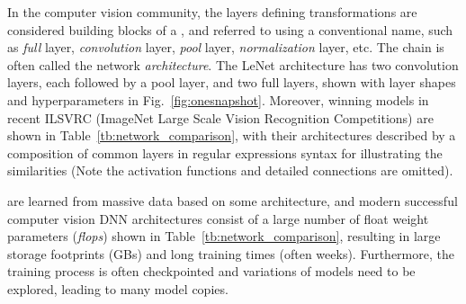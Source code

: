 \documentclass[conference]{IEEEtran}
\begin{document}
In the computer vision community, the layers defining transformations are considered building blocks of a \dnn\model, and referred to using a conventional name, such as {\em full} layer, {\em convolution} layer, {\em pool} layer, {\em normalization} layer, etc. The chain is often called the network \emph{architecture}. The LeNet architecture has two convolution layers, each followed by a pool layer, and two full layers, shown with layer shapes and hyperparameters in Fig.~\ref{fig:onesnapshot}.
Moreover, winning models in recent ILSVRC (ImageNet Large Scale Vision Recognition Competitions) are shown in Table~\ref{tb:network_comparison}, with their architectures described by a composition of common layers in regular expressions syntax for illustrating the similarities (Note the activation functions and detailed connections are omitted).  %


\dnn\models are learned from massive data based on some architecture, and 
modern successful computer vision DNN architectures consist of a large number of float weight parameters (\emph{flops}) 
 shown in Table~\ref{tb:network_comparison}, resulting in large storage footprints (GBs) and long training times (often weeks). Furthermore, the training process is often checkpointed and variations of models need to be explored, leading to many model copies.
\end{document}
